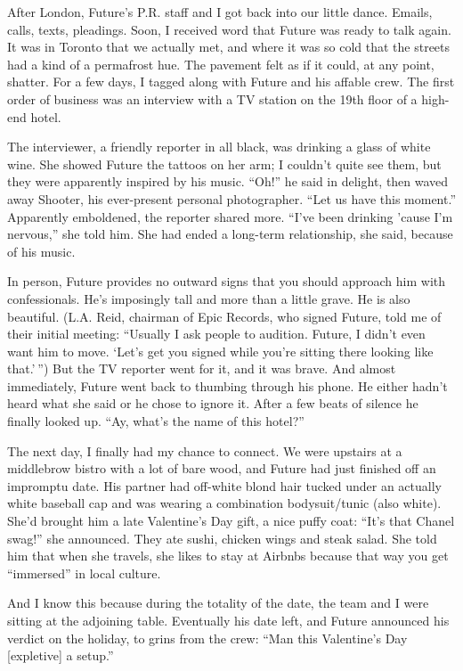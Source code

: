 After London, Future's P.R. staff and I got back into our little dance.
Emails, calls, texts, pleadings. Soon, I received word that Future was
ready to talk again. It was in Toronto that we actually met, and where
it was so cold that the streets had a kind of a permafrost hue. The
pavement felt as if it could, at any point, shatter. For a few days, I
tagged along with Future and his affable crew. The first order of
business was an interview with a TV station on the 19th floor of a
high-end hotel.

The interviewer, a friendly reporter in all black, was drinking a glass
of white wine. She showed Future the tattoos on her arm; I couldn't
quite see them, but they were apparently inspired by his music. ``Oh!''
he said in delight, then waved away Shooter, his ever-present personal
photographer. ``Let us have this moment.'' Apparently emboldened, the
reporter shared more. ``I've been drinking 'cause I'm nervous,'' she
told him. She had ended a long-term relationship, she said, because of
his music.

In person, Future provides no outward signs that you should approach him
with confessionals. He's imposingly tall and more than a little grave.
He is also beautiful. (L.A. Reid, chairman of Epic Records, who signed
Future, told me of their initial meeting: ``Usually I ask people to
audition. Future, I didn't even want him to move. `Let's get you signed
while you're sitting there looking like that.' '') But the TV reporter
went for it, and it was brave. And almost immediately, Future went back
to thumbing through his phone. He either hadn't heard what she said or
he chose to ignore it. After a few beats of silence he finally looked
up. ``Ay, what's the name of this hotel?''

The next day, I finally had my chance to connect. We were upstairs at a
middlebrow bistro with a lot of bare wood, and Future had just finished
off an impromptu date. His partner had off-white blond hair tucked under
an actually white baseball cap and was wearing a combination
bodysuit/tunic (also white). She'd brought him a late Valentine's Day
gift, a nice puffy coat: ``It's that Chanel swag!'' she announced. They
ate sushi, chicken wings and steak salad. She told him that when she
travels, she likes to stay at Airbnbs because that way you get
``immersed'' in local culture.

And I know this because during the totality of the date, the team and I
were sitting at the adjoining table. Eventually his date left, and
Future announced his verdict on the holiday, to grins from the crew:
``Man this Valentine's Day {[}expletive{]} a setup.''

